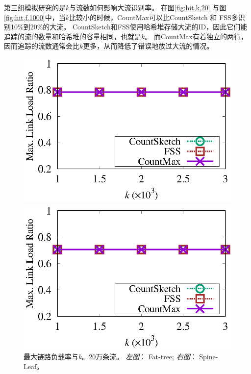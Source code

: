 第三组模拟研究的是$k$与流数如何影响大流识别率。
在图\ref{fig:hit,k,20} 与图 \ref{fig:hit,f,1000}中，当$k$比较小的时候，CountMax可以比CountSketch 和 FSS多识别10\%到20\%的大流。
CountSketch和FSS使用哈希堆存储大流的ID，因此它们能追踪的流的数量和哈希堆的容量相同，也就是$k$。
而CountMax有着独立的两行，因而追踪的流数通常会比$k$更多，从而降低了错误地放过大流的情况。



\begin{figure}[!t]
	\centering
	\begin{minipage}[t]{0.49\linewidth}
		\centering
		\includegraphics[width=\linewidth]{fig/ft_k_load_200000.eps}
	\end{minipage}\vspace{-0.6em}%
	\begin{minipage}[t]{0.49\linewidth}
		\centering
		\includegraphics[width=\linewidth]{fig/hy_k_load_200000.eps}
	\end{minipage}\vspace{-0.6em}
	\caption{\textnormal{最大链路负载率与$k$。20万条流。 \textit{左图}： Fat-tree; \textit{右图}： Spine-Leaf。}}
	\label{fig:load,k}
\end{figure}


